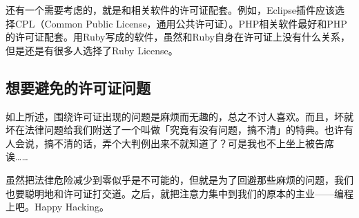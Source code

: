 \documentclass[a4paper,12pt]{article}
\begin{document}
还有一个需要考虑的，就是和相关软件的许可证配套。例如，Eclipse插件应该选择CPL（Common Public License，通用公共许可证）。PHP相关软件最好和PHP的许可证配套。用Ruby写成的软件，虽然和Ruby自身在许可证上没有什么关系，但是还是有很多人选择了Ruby License。

\subsection{想要避免的许可证问题}

如上所述，围绕许可证出现的问题是麻烦而无趣的，总之不讨人喜欢。而且，坏就坏在法律问题给我们附送了一个叫做「究竟有没有问题，搞不清」的特典。也许有人会说，搞不清的话，弄个大判例出来不就知道了？可是我也不上坐上被告席诶……

虽然把法律危险减少到零似乎是不可能的，但就是为了回避那些麻烦的问题，我们也要聪明地和许可证打交道。之后，就把注意力集中到我们的原本的主业——编程上吧。Happy Hacking。

\end{document}
